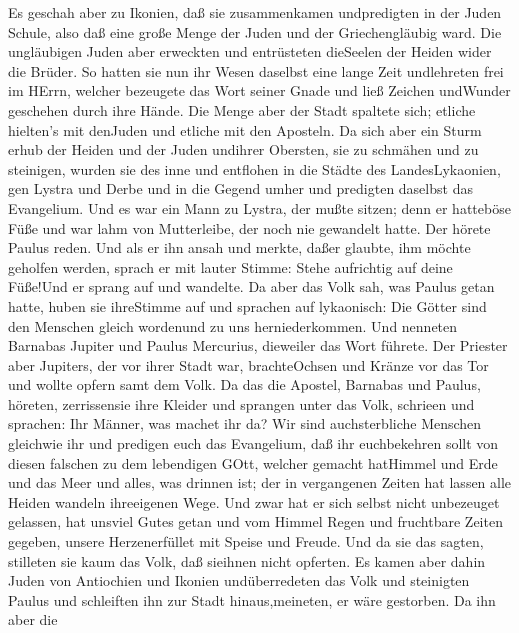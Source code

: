  Es geschah aber zu Ikonien, daß sie zusammenkamen
undpredigten in der Juden Schule, also daß eine große Menge der Juden
und der Griechengläubig ward.  Die ungläubigen Juden aber
erweckten und entrüsteten dieSeelen der Heiden wider die Brüder.
 So hatten sie nun ihr Wesen daselbst eine lange Zeit
undlehreten frei im HErrn, welcher bezeugete das Wort seiner Gnade und
ließ Zeichen undWunder geschehen durch ihre Hände.  Die
Menge aber der Stadt spaltete sich; etliche hielten's mit denJuden und
etliche mit den Aposteln.  Da sich aber ein Sturm erhub der
Heiden und der Juden undihrer Obersten, sie zu schmähen und zu
steinigen,  wurden sie des inne und entflohen in die Städte
des LandesLykaonien, gen Lystra und Derbe und in die Gegend umher
 und predigten daselbst das Evangelium.  Und es
war ein Mann zu Lystra, der mußte sitzen; denn er hatteböse Füße und war
lahm von Mutterleibe, der noch nie gewandelt hatte.  Der
hörete Paulus reden. Und als er ihn ansah und merkte, daßer glaubte, ihm
möchte geholfen werden,  sprach er mit lauter Stimme: Stehe
aufrichtig auf deine Füße!Und er sprang auf und wandelte. 
Da aber das Volk sah, was Paulus getan hatte, huben sie ihreStimme auf
und sprachen auf lykaonisch: Die Götter sind den Menschen gleich
wordenund zu uns herniederkommen.  Und nenneten Barnabas
Jupiter und Paulus Mercurius, dieweiler das Wort führete. 
Der Priester aber Jupiters, der vor ihrer Stadt war, brachteOchsen und
Kränze vor das Tor und wollte opfern samt dem Volk.  Da das
die Apostel, Barnabas und Paulus, höreten, zerrissensie ihre Kleider und
sprangen unter das Volk, schrieen  und sprachen: Ihr
Männer, was machet ihr da? Wir sind auchsterbliche Menschen gleichwie
ihr und predigen euch das Evangelium, daß ihr euchbekehren sollt von
diesen falschen zu dem lebendigen GOtt, welcher gemacht hatHimmel und
Erde und das Meer und alles, was drinnen ist;  der in
vergangenen Zeiten hat lassen alle Heiden wandeln ihreeigenen Wege.
 Und zwar hat er sich selbst nicht unbezeuget gelassen, hat
unsviel Gutes getan und vom Himmel Regen und fruchtbare Zeiten gegeben,
unsere Herzenerfüllet mit Speise und Freude.  Und da sie
das sagten, stilleten sie kaum das Volk, daß sieihnen nicht opferten.
 Es kamen aber dahin Juden von Antiochien und Ikonien
undüberredeten das Volk und steinigten Paulus und schleiften ihn zur
Stadt hinaus,meineten, er wäre gestorben.  Da ihn aber die
